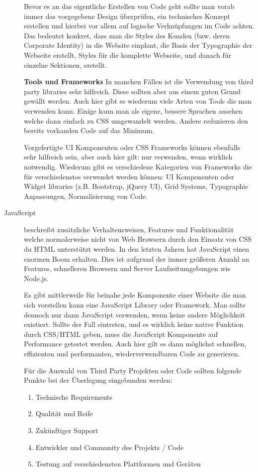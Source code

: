 \begin{description}
Bevor es an das eigentliche Erstellen von Code geht sollte man vorab immer das vorgegebene Design überprüfen, ein technisches Konzept erstellen und hierbei vor allem auf logische Verknüpfungen im Code achten. Das bedeutet konkret, dass man die Styles des Kunden (bzw. deren Corporate Identity) in die Website einplant, die Basis der Typographie der Webseite erstellt, Styles für die komplette Webseite, und danach für einzelne Sektionen, erstellt.

\textbf{Tools und Frameworks\newline}
In manchen Fällen ist die Verwendung von third party libraries sehr hilfreich. Diese sollten aber aus einem guten Grund gewällt werden. Auch hier gibt es wiederum viele Arten von Tools die man verwenden kann. Einige kann man als eigene, bessere Sprachen ansehen welche dann einfach zu CSS umgewandelt werden. Andere reduzieren den bereits vorhanden Code auf das Minimum.

Vorgefertigte UI Komponenten oder CSS Frameworks können ebenfalls sehr hilfreich sein, aber auch hier gilt: nur verwenden, wenn wirklich notwendig. Wiederum gibt es verschiedene Kategorien von Frameworks die für verschiedenstes verwendet werden können: UI Komponenten oder Widget libraries (z.B. Bootstrap, jQuery UI), Grid Systems, Typographie Anpassungen, Normalisierung von Code.


\item[JavaScript\newline]
beschreibt zusätzliche Verhaltensweisen, Features und Funktionalität welche normalerweise nicht von Web Browsern durch den Einsatz von CSS du HTML unterstützt werden. In den letzten Jahren hat JavaScript einen enormen Boom erhalten. Dies ist aufgrund der immer größeren Anzahl an Features, schnelleren Browsern und Server Laufzeitumgebungen wie Node.js. 

Es gibt mittlerweile für beinahe jede Komponente einer Website die man sich vorstellen kann eine JavaScript Library oder Framework. Man sollte dennoch nur dann JavaScript verwenden, wenn keine andere Möglichkeit existiert.  Sollte der Fall eintreten, und es wirklich keine native Funktion durch CSS/HTML geben, muss die JavaScript Komponente auf Performance getestet werden. Auch hier gilt es dann möglichst schnellen, effizienten und performanten, wiederverwendbaren Code zu generieren. 

Für die Auswahl von Third Party Projekten oder Code sollten folgende Punkte bei der Überlegung eingebunden werden:
\begin{enumerate}
\item Technische Requirements 
\item Qualität und Reife
\item Zukünftiger Support
\item Entwickler und Community des Projekts / Code
\item Testung auf verschiedensten Plattformen und Geräten
\end{enumerate}


\end{description}
